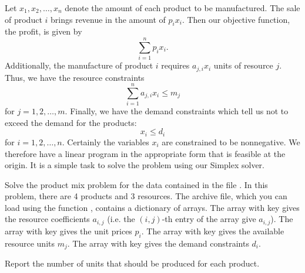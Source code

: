 Let  $x_1, x_2, \ldots, x_n$ denote the amount of each product to be manufactured.
The sale of product $i$ brings revenue in the amount of $p_ix_i$.
Then our objective function, the profit, is given by
\[
\sum_{i=1}^n p_ix_i.
\]
Additionally, the manufacture of product $i$ requires $a_{j,i}x_i$ units of resource $j$.
Thus, we have the resource constraints
\[
\sum_{i=1}^n a_{j,i}x_i \leq m_j
\]
for $j = 1, 2, \ldots, m$.
Finally, we have the demand constraints which tell us not to exceed the demand for the products:
\[
x_i \leq d_i
\]
for $i = 1, 2, \ldots, n$.
Certainly the variables $x_i$ are constrained to be nonnegative. We therefore have a linear program in the appropriate form that is feasible at the origin.
It is a simple task to solve the problem using our Simplex solver.

\begin{problem}
Solve the product mix problem for the data contained in the file . In this problem, there are 4 products and 3 resources.
The archive file, which you can load using the function
, contains a dictionary of arrays. The array with key  gives the resource coefficients $a_{i,j}$ (i.e. the $(i,j)$-th entry
of the array give $a_{i,j}$). The array with key  gives the unit prices $p_i$. The array with key  gives the available resource
units $m_j$. The array with key  gives the demand constraints $d_i$.

Report the number of units that should be produced for each product.
\end{problem}
%
%
%
